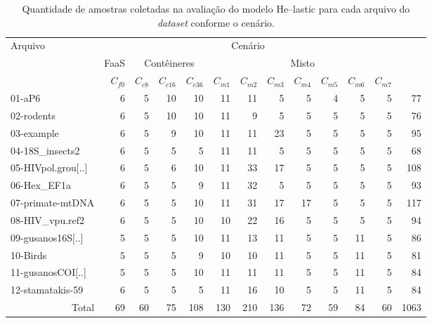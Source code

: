 \documentclass[english,brazilian]{UNISINOSmonografia} %
\newcommand\tabelaAngulo{90}
\begin{document}
\begin{table}[tbp]
	\centering%
	\begin{minipage}{\textwidth}
		\caption{Quantidade de amostras coletadas na avaliação do modelo \textsf{He}--lastic para cada arquivo do \textit{dataset} conforme o cenário.}
		\label{tab:results-modelo-samples}
		\vspace{1ex}
		\footnotesize
		\begin{tabular*}{\textwidth}{@{\extracolsep{\fill}}lrrrrrrrrrrrr@{}}
			\toprule
			\multirow[b]{3}{*}{Arquivo} & \multicolumn{11}{c}{Cenário} &
			\multirow[b]{3}{*}{\rotatebox[origin=c]{\tabelaAngulo}{\begin{tabular}[c]{@{}c@{}}Total\end{tabular}}} \\ \cmidrule(lr){2-12}
			& \multicolumn{1}{c}{FaaS} & \multicolumn{3}{c}{Contêineres} & \multicolumn{7}{c}{Misto} & \multicolumn{1}{c}{} \\ 
			\cmidrule(lr){2-2}
			\cmidrule(lr){3-5}
			\cmidrule(lr){6-12}
			& $C_{f0}$ & $C_{c8}$ & $C_{c16}$ & $C_{c36}$ & $C_{m1}$ & $C_{m2}$ & $C_{m3}$ & $C_{m4}$ & $C_{m5}$ & $C_{m6}$ & $C_{m7}$ & \multicolumn{1}{c}{} \\
			\midrule
			01-aP6 & 6 & 5 & 10 & 10 & 11 & 11 & 5 & 5 & 4 & 5 & 5 & 77 \\
			02-rodents & 6 & 5 & 10 & 10 & 11 & 9 & 5 & 5 & 5 & 5 & 5 & 76 \\
			03-example & 6 & 5 & 9 & 10 & 11 & 11 & 23 & 5 & 5 & 5 & 5 & 95 \\
			04-18S\_insects2 & 6 & 5 & 5 & 5 & 11 & 11 & 5 & 5 & 5 & 5 & 5 & 68 \\
			05-HIVpol.grou[..] & 6 & 5 & 6 & 10 & 11 & 33 & 17 & 5 & 5 & 5 & 5 & 108 \\
			06-Hex\_EF1a & 6 & 5 & 5 & 9 & 11 & 32 & 5 & 5 & 5 & 5 & 5 & 93 \\
			07-primate-mtDNA & 6 & 5 & 5 & 10 & 11 & 31 & 17 & 17 & 5 & 5 & 5 & 117 \\
			08-HIV\_vpu.ref2 & 6 & 5 & 5 & 10 & 10 & 22 & 16 & 5 & 5 & 5 & 5 & 94 \\
			09-gusanos16S[..] & 5 & 5 & 5 & 10 & 11 & 13 & 11 & 5 & 5 & 11 & 5 & 86 \\
			10-Birds & 5 & 5 & 5 & 9 & 10 & 10 & 11 & 5 & 5 & 11 & 5 & 81 \\
			11-gusanosCOI[..] & 5 & 5 & 5 & 10 & 11 & 11 & 11 & 5 & 5 & 11 & 5 & 84 \\
			12-stamatakis-59 & 6 & 5 & 5 & 5 & 11 & 16 & 10 & 5 & 5 & 11 & 5 & 84 \\
			\bottomrule
			\multicolumn{1}{r}{Total} & 69 & 60 & 75 & 108 & 130 & 210 & 136 & 72 & 59 & 84 & 60 & {\scriptsize 1063} \\ 
		\end{tabular*}
	\end{minipage}
\end{table}
\end{document}
